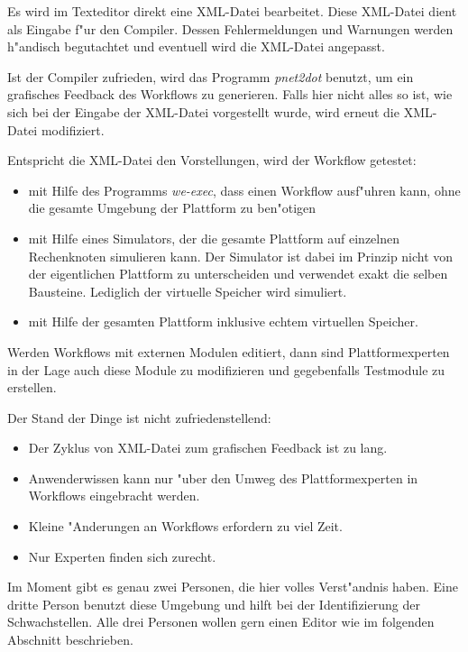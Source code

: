 \documentclass[a4paper,12pt]{article}
\newlength{\st}\setlength{\st}{0pt}
\newcommand{\program}[1]{\textit{#1}}
\begin{document}
Es wird im Texteditor direkt eine XML-Datei bearbeitet. Diese
XML-Datei dient als Eingabe f"ur den Compiler. Dessen Fehlermeldungen
und Warnungen werden h"andisch begutachtet und eventuell wird die
XML-Datei angepasst.

Ist der Compiler zufrieden, wird das Programm \program{pnet2dot}
benutzt, um ein grafisches Feedback des Workflows zu generieren. Falls
hier nicht alles so ist, wie sich bei der Eingabe der XML-Datei
vorgestellt wurde, wird erneut die XML-Datei modifiziert.

Entspricht die XML-Datei den Vorstellungen, wird der Workflow
getestet:
\begin{itemize}
\item mit Hilfe des Programms \program{we-exec}, dass einen Workflow
  ausf"uhren kann, ohne die gesamte Umgebung der Plattform zu
  ben"otigen

\item mit Hilfe eines Simulators, der die gesamte Plattform auf
  einzelnen Rechenknoten simulieren kann. Der Simulator ist dabei im
  Prinzip nicht von der eigentlichen Plattform zu unterscheiden und
  verwendet exakt die selben Bausteine. Lediglich der virtuelle
  Speicher wird simuliert.

\item mit Hilfe der gesamten Plattform inklusive echtem virtuellen
  Speicher.
\end{itemize}

Werden Workflows mit externen Modulen editiert, dann sind
Plattformexperten in der Lage auch diese Module zu modifizieren und
gegebenfalls Testmodule zu erstellen.

Der Stand der Dinge ist nicht zufriedenstellend:
\begin{itemize}
\item Der Zyklus von XML-Datei zum grafischen Feedback ist zu lang.
\item Anwenderwissen kann nur "uber den Umweg des Plattformexperten in
  Workflows eingebracht werden.
\item Kleine "Anderungen an Workflows erfordern zu viel Zeit.
\item Nur Experten finden sich zurecht.
\end{itemize}

Im Moment gibt es genau zwei Personen, die hier volles Verst"andnis
haben. Eine dritte Person benutzt diese Umgebung und hilft bei der
Identifizierung der Schwachstellen. Alle drei Personen wollen gern
einen Editor wie im folgenden Abschnitt beschrieben.
\end{document}
